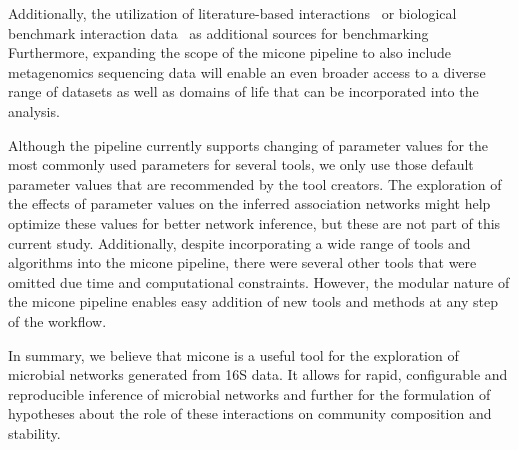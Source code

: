   Additionally, the utilization of literature-based interactions~\cite{lima-mendezDeterminantsCommunityStructure2015a} or biological benchmark interaction data~\cite{sungGlobalMetabolicInteraction2017a} as additional sources for benchmarking
  Furthermore, expanding the scope of the \ac{micone} pipeline to also include metagenomics sequencing data will enable an even broader access to a diverse range of datasets as well as domains of life that can be incorporated into the analysis.

  Although the pipeline currently supports changing of parameter values for the most commonly used parameters for several tools, we only use those default parameter values that are recommended by the tool creators.
  The exploration of the effects of parameter values on the inferred association networks might help optimize these values for better network inference, but these are not part of this current study.
  Additionally, despite incorporating a wide range of tools and algorithms into the \ac{micone} pipeline, there were several other tools that were omitted due time and computational constraints.
  However, the modular nature of the \ac{micone} pipeline enables easy addition of new tools and methods at any step of the workflow.


  In summary, we believe that \ac{micone} is a useful tool for the exploration of microbial networks generated from 16S data.
  It allows for rapid, configurable and reproducible inference of microbial networks and further for the formulation of hypotheses about the role of these interactions on community composition and stability.
